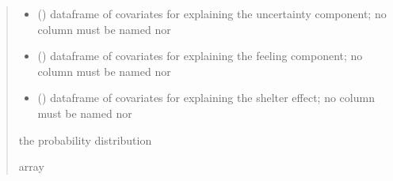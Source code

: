 \documentclass[letterpaper,10pt,english]{sphinxmanual}
\begin{document}
\begin{fulllineitems}
\begin{quote}
\begin{description}
\begin{itemize}
\item {} 
\sphinxAtStartPar
{} () \textendash{} dataframe of covariates for explaining the uncertainty component;
no column must be named  nor 

\item {} 
\sphinxAtStartPar
{} () \textendash{} dataframe of covariates for explaining the feeling component;
no column must be named  nor 

\item {} 
\sphinxAtStartPar
{} () \textendash{} dataframe of covariates for explaining the shelter effect;
no column must be named  nor 

\end{itemize}

\sphinxAtStartPar
the probability distribution

\sphinxAtStartPar
array

\end{description}\end{quote}

\end{fulllineitems}

\end{document}
